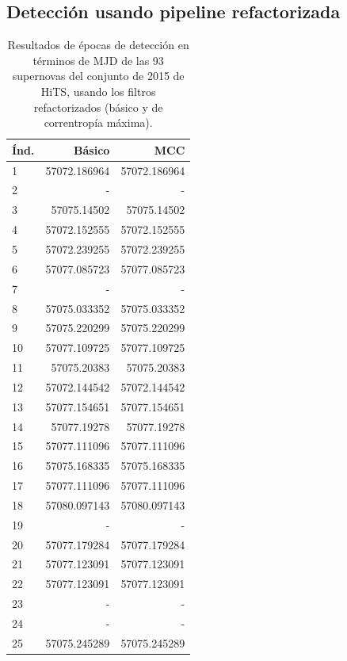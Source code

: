 \begin{appendix}
\section{Detecci\'on usando pipeline refactorizada}
\label{ap:pip_ref}
\begin{table}[h!]
\small
\centering
\caption{Resultados de \'epocas de detecci\'on en t\'erminos de MJD de las 93 supernovas del conjunto de 2015 de HiTS, usando los filtros refactorizados (b\'asico y de correntrop\'ia m\'axima).}
\begin{tabular}{|l|r|r|}
\hline
\textbf{\'Ind.} & \textbf{B\'asico} & \textbf{MCC} \\\hline
1& 57072.186964   & 57072.186964   \\
2& -              & -              \\
3& 57075.14502    & 57075.14502    \\
4& 57072.152555   & 57072.152555   \\
5& 57072.239255   & 57072.239255   \\
6& 57077.085723   & 57077.085723   \\
7& -              & -              \\
8& 57075.033352   & 57075.033352   \\
9& 57075.220299   & 57075.220299   \\
10& 57077.109725   & 57077.109725   \\
11& 57075.20383    & 57075.20383    \\
12& 57072.144542   & 57072.144542   \\
13& 57077.154651   & 57077.154651   \\
14& 57077.19278    & 57077.19278    \\
15& 57077.111096   & 57077.111096   \\
16& 57075.168335   & 57075.168335   \\
17& 57077.111096   & 57077.111096   \\
18& 57080.097143   & 57080.097143   \\
19& -              & -              \\
20& 57077.179284   & 57077.179284   \\
21& 57077.123091   & 57077.123091   \\
22& 57077.123091   & 57077.123091   \\
23& -              & -              \\
24& -              & -              \\
25& 57075.245289   & 57075.245289   \\

\end{tabular}
\end{table}
\end{appendix}
